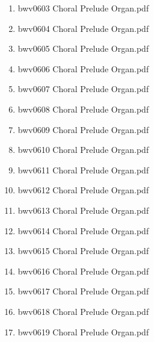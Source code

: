 \documentclass[11pt]{article}
\begin{document}
\begin{enumerate}
\begin{enumerate}
\begin{enumerate}
\begin{enumerate}
\item bwv0603   Choral Prelude Organ.pdf
\label{sec-1-1-1-1-44-6-4-1-12-5}

\item bwv0604   Choral Prelude Organ.pdf
\label{sec-1-1-1-1-44-6-4-1-12-6}

\item bwv0605   Choral Prelude Organ.pdf
\label{sec-1-1-1-1-44-6-4-1-12-7}

\item bwv0606   Choral Prelude Organ.pdf
\label{sec-1-1-1-1-44-6-4-1-12-8}

\item bwv0607   Choral Prelude Organ.pdf
\label{sec-1-1-1-1-44-6-4-1-12-9}

\item bwv0608   Choral Prelude Organ.pdf
\label{sec-1-1-1-1-44-6-4-1-12-10}

\item bwv0609   Choral Prelude Organ.pdf
\label{sec-1-1-1-1-44-6-4-1-12-11}

\item bwv0610   Choral Prelude Organ.pdf
\label{sec-1-1-1-1-44-6-4-1-12-12}

\item bwv0611   Choral Prelude Organ.pdf
\label{sec-1-1-1-1-44-6-4-1-12-13}

\item bwv0612   Choral Prelude Organ.pdf
\label{sec-1-1-1-1-44-6-4-1-12-14}

\item bwv0613   Choral Prelude Organ.pdf
\label{sec-1-1-1-1-44-6-4-1-12-15}

\item bwv0614   Choral Prelude Organ.pdf
\label{sec-1-1-1-1-44-6-4-1-12-16}

\item bwv0615   Choral Prelude Organ.pdf
\label{sec-1-1-1-1-44-6-4-1-12-17}

\item bwv0616   Choral Prelude Organ.pdf
\label{sec-1-1-1-1-44-6-4-1-12-18}

\item bwv0617   Choral Prelude Organ.pdf
\label{sec-1-1-1-1-44-6-4-1-12-19}

\item bwv0618   Choral Prelude Organ.pdf
\label{sec-1-1-1-1-44-6-4-1-12-20}

\item bwv0619   Choral Prelude Organ.pdf
\label{sec-1-1-1-1-44-6-4-1-12-21}


\end{enumerate}
\end{enumerate}
\end{enumerate}
\end{enumerate}
\end{document}
